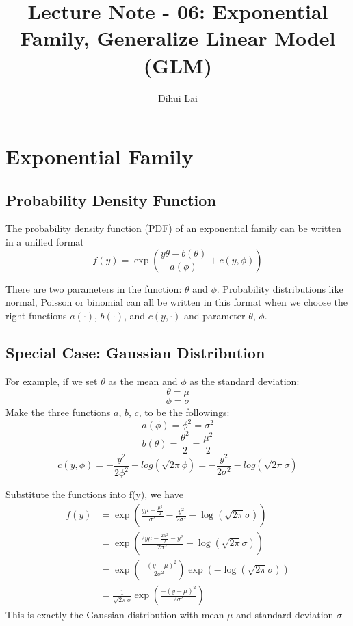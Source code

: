 \documentclass[12pt, oneside]{article}
\title{Lecture Note - 06: Exponential Family, Generalize Linear Model (GLM)}
\author{Dihui Lai}
\begin{document}
\maketitle
\tableofcontents

\vspace{.25in}

\section{Exponential Family }

\subsection{Probability Density Function}
The probability density function (PDF) of an exponential family can be written in a unified format
$$
{f(y)}=\exp{\left( \frac{y\theta-b(\theta)}{a(\phi)}+c(y, \phi)\right)}
$$

There are two parameters in the function: $\theta$ and $\phi$. Probability distributions like normal, Poisson or binomial can all be written in this format when we choose the right functions $a(\cdot)$, $b(\cdot)$, and $c(y, \cdot)$ and parameter $\theta$,  $\phi$. 

\subsection{Special Case: Gaussian Distribution}
For example, if we set $\theta$ as the mean and $\phi$ as the standard deviation:
$$\theta=\mu$$
$$\phi=\sigma$$
Make the three functions $a$, $b$, $c$, to be the followings:
$$a(\phi)=\phi^2=\sigma^2$$
$$b(\theta)=\frac{\theta^2}{2}=\frac{\mu^2}{2}$$
$$c(y,\phi)=-\frac{y^2}{2\phi^2}-log(\sqrt{2\pi}\phi)=-\frac{y^2}{2\sigma^2}-log(\sqrt{2\pi}\sigma)$$

Substitute the functions into f(y), we have 
\begin{align*}
{f(y)}
&=\exp{\left( \frac{y\mu-\frac{\mu^2}{2}}{\sigma^2}-\frac{y^2}{2\sigma^2}-\log(\sqrt{2\pi}\sigma)\right)}\\
&=\exp{\left( \frac{2y\mu-\frac{2\mu^2}{2}-y^2}{2\sigma^2}-\log(\sqrt{2\pi}\sigma)\right)}\\
&=\exp{\left( \frac{-(y-\mu)^2}{2\sigma^2}\right)\exp(-\log(\sqrt{2\pi}\sigma))}\\
&=\frac{1}{\sqrt{2\pi}\sigma}\exp{\left( \frac{-(y-\mu)^2}{2\sigma^2}\right)}
\end{align*}
This is exactly the Gaussian distribution with mean $\mu$ and standard deviation $\sigma$
\end{document}
